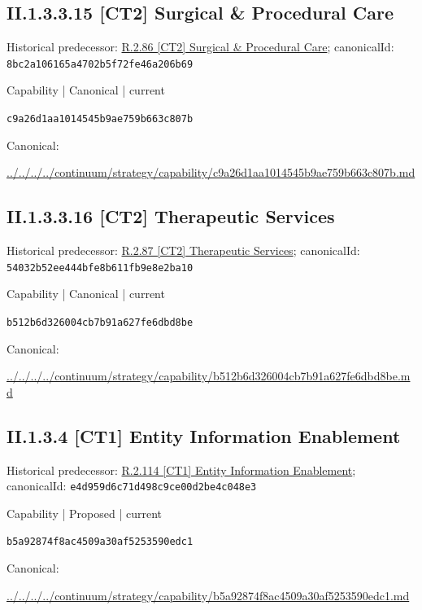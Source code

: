 \documentclass[10pt,a4paper]{article}
\begin{document}
\subsection*{II.1.3.3.15 [CT2] Surgical \& Procedural Care}
Historical predecessor: \hyperref[element-8bc2a106165a4702b5f72fe46a206b69]{R.2.86 [CT2] Surgical \& Procedural Care}; canonicalId: \texttt{8bc2a106165a4702b5f72fe46a206b69}\par
\label{element-c9a26d1aa1014545b9ae759b663c807b}
{\small Capability | Canonical | current}\par
\texttt{c9a26d1aa1014545b9ae759b663c807b}\par
Canonical: \par
{\footnotesize\url{../../../../continuum/strategy/capability/c9a26d1aa1014545b9ae759b663c807b.md}}\par
\subsection*{II.1.3.3.16 [CT2] Therapeutic Services}
Historical predecessor: \hyperref[element-54032b52ee444bfe8b611fb9e8e2ba10]{R.2.87 [CT2] Therapeutic Services}; canonicalId: \texttt{54032b52ee444bfe8b611fb9e8e2ba10}\par
\label{element-b512b6d326004cb7b91a627fe6dbd8be}
{\small Capability | Canonical | current}\par
\texttt{b512b6d326004cb7b91a627fe6dbd8be}\par
Canonical: \par
{\footnotesize\url{../../../../continuum/strategy/capability/b512b6d326004cb7b91a627fe6dbd8be.md}}\par
\subsection*{II.1.3.4 [CT1] Entity Information Enablement}
Historical predecessor: \hyperref[element-e4d959d6c71d498c9ce00d2be4c048e3]{R.2.114 [CT1] Entity Information Enablement}; canonicalId: \texttt{e4d959d6c71d498c9ce00d2be4c048e3}\par
\label{element-b5a92874f8ac4509a30af5253590edc1}
{\small Capability | Proposed | current}\par
\texttt{b5a92874f8ac4509a30af5253590edc1}\par
Canonical: \par
{\footnotesize\url{../../../../continuum/strategy/capability/b5a92874f8ac4509a30af5253590edc1.md}}\par
\end{document}
